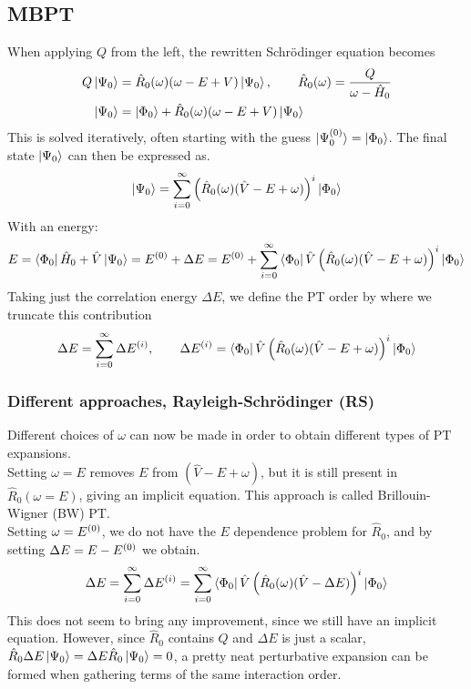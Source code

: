 \documentclass[
11pt,notheorems,hyperref={pdfauthor=whatever}
]{beamer}
\begin{document}
\subsection{MBPT}
\begin{frame}
    When applying $Q$ from the left, the rewritten Schr\"{o}dinger equation becomes
    \begin{align*}
        Q\ket{\Psi_0} &= \hat{R}_0(\omega) (\omega - E + V)\ket{\Psi_0}, \hspace{20px} \hat{R}_0 (\omega) = \frac{Q}{\omega-\hat{H}_0} \\
        \ket{\Psi_0} &= \gs + \hat{R}_0(\omega) (\omega - E + V)\ket{\Psi_0}
    \end{align*}
    This is solved iteratively, often starting with the guess $\ket{\Psi_0^{(0)}} = \ket{\Phi_0}$. The final state $\ket{\Psi_0}$ can then be expressed as. 
    \begin{align*}
        \ket{\Psi_0} = \sum_{i=0}^\infty \left( \hat{R}_0(\omega) (\hat{V}-E+\omega) \right)^i \ket{\Phi_0}
    \end{align*}
    With an energy:
    \begin{align*}
        E = \bra{\Phi_0}\hat{H}_0 + \hat{V}\ket{\Psi_0}= E^{(0)} + \Delta E = E^{(0)} +  \sum_{i=0}^\infty  \bra{\Phi_0} \hat{V}\left( \hat{R}_0(\omega) (\hat{V}-E+\omega) \right)^i \ket{\Phi_0}    
    \end{align*}
    Taking just the correlation energy $\Delta E$, we define the PT order by where we truncate this contribution
    \begin{align*}
        \Delta E = \sum_{i=0}^\infty \ord{\Delta E}{i},\hspace{20px} \ord{\Delta E}{i} = \bra{\Phi_0} \hat{V}\left( \hat{R}_0(\omega) (\hat{V}-E+\omega) \right)^i \gs
    \end{align*}
\end{frame}

\begin{frame}
    \frametitle{Different approaches, Rayleigh-Schr\"{o}dinger (RS)}
    Different choices of $\omega$ can now be made in order to obtain diﬀerent types of PT expansions. 
    \\[10pt]
    Setting $\omega = E$ removes $E$ from $(\hat{V}-E+\omega)$, but it is still present in $\hat{R}_0(\omega = E)$, giving an implicit equation. This approach is called Brillouin-Wigner (BW) PT.
    \\[10pt] Setting $\omega = E^{(0)}$, we do not have the $E$ dependence problem for $\hat{R}_0$, and by setting $\Delta E = E - E^{(0)}$ we obtain.
    \begin{align*}
        \Delta E = \sum_{i=0}^\infty \Delta E^{(i)} = \sum_{i=0}^\infty \bra{\Phi_0} \hat{V}\left( \hat{R}_0(\omega) (\hat{V}-\Delta E) \right)^i \ket{\Phi_0}
    \end{align*}
    This does not seem to bring any improvement, since we still have an implicit equation. However, since $\hat{R}_0$ contains $Q$ and $\Delta E$ is just a scalar, $\hat{R}_0 \Delta E \ket{\Psi_0} = \Delta E \hat{R}_0 \ket{\Psi_0} = 0$, a pretty neat perturbative expansion can be formed when gathering terms of the same interaction order. 
\end{frame}
\end{document}
